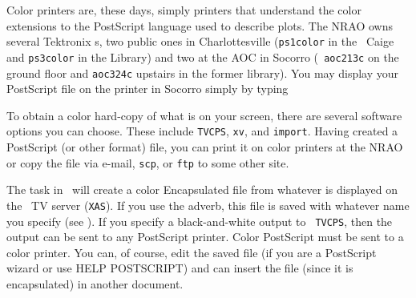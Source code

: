      Color printers are, these days, simply printers that understand
the color extensions to the PostScript language used to describe
plots.  The NRAO owns several Tektronix s, two
public ones in Charlottesville ({\tt ps1color} in the \AIPS\ Caige and
{\tt ps3color} in the Library) and two at the AOC in Socorro ({\tt
aoc213c} on the ground floor and {\tt aoc324c} upstairs in the former
library).  You may display your PostScript file on the printer in
Socorro simply by typing


     To obtain a color hard-copy of what is on your screen, there are
several software options you can choose.  These include {\tt TVCPS},
{\tt xv}, and {\tt import}.  Having created a PostScript (or other
format) file, you can print it on color printers at the NRAO or copy
the file via e-mail, {\tt scp}, or {\tt ftp} to some other site.

     The {\tt {}} task in \AIPS\ will create a color
Encapsulated  file from whatever is displayed on the
\AIPS\ TV server ({\tt XAS})\@.  If you use the {\tt {}}
adverb, this file is saved with whatever name you specify (see
).  If you specify a black-and-white output to {\tt
TVCPS}, then the output can be sent to any PostScript printer.  Color
PostScript must be sent to a color printer.  You can, of course, edit
the saved file (if you are a PostScript wizard or use {\us HELP
POSTSCRIPT}) and can insert the file (since it is encapsulated) in
another document.

